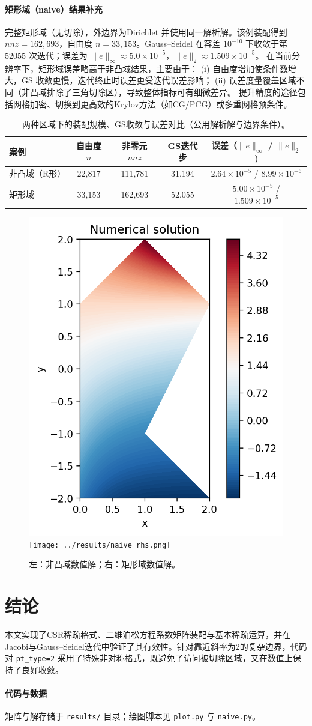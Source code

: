 \documentclass[11pt,a4paper]{article}
\begin{document}
\paragraph{矩形域（naive）结果补充}
完整矩形域（无切除），外边界为Dirichlet 并使用同一解析解。该例装配得到 $nnz=162{,}693$，自由度 $n=33{,}153$。Gauss--Seidel 在容差 $10^{-10}$ 下收敛于第 $52055$ 次迭代；误差为
$\|e\|_\infty \approx 5.0\times 10^{-5}$，$\|e\|_{2} \approx 1.509\times 10^{-5}$。
在当前分辨率下，矩形域误差略高于非凸域结果，主要由于：
(i) 自由度增加使条件数增大，GS 收敛更慢，迭代终止时误差更受迭代误差影响；
(ii) 误差度量覆盖区域不同（非凸域排除了三角切除区），导致整体指标可有细微差异。
提升精度的途径包括网格加密、切换到更高效的Krylov方法（如CG/PCG）或多重网格预条件。

\begin{table}[h]
\centering
\begin{tabular}{lcccc}
\hline
案例 & 自由度 $n$ & 非零元 $nnz$ & GS迭代步 & 误差（$\|e\|_\infty$ / $\|e\|_2$) \\
\hline
非凸域（R形） & 22{,}817 & 111{,}781 & 31{,}194 & $2.64\!\times\!10^{-5}$ / $8.99\!\times\!10^{-6}$ \\
矩形域 & 33{,}153 & 162{,}693 & 52{,}055 & $5.00\!\times\!10^{-5}$ / $1.509\!\times\!10^{-5}$ \\
\hline
\end{tabular}
\caption{两种区域下的装配规模、GS收敛与误差对比（公用解析解与边界条件）。}
\end{table}

\begin{figure}[h]
  \centering
  \includegraphics[width=0.46\linewidth]{../results/solution.png}\quad
  \texttt{[image: ../results/naive\_rhs.png]}
  \caption{左：非凸域数值解；右：矩形域数值解。}
\end{figure}

\section{结论}
本文实现了CSR稀疏格式、二维泊松方程系数矩阵装配与基本稀疏运算，并在Jacobi与Gauss--Seidel迭代中验证了其有效性。针对靠近斜率为2的复杂边界，代码对 \texttt{pt\_type=2} 采用了特殊非对称格式，既避免了访问被切除区域，又在数值上保持了良好收敛。

\paragraph{代码与数据}
矩阵与解存储于 \texttt{results/} 目录；绘图脚本见 \texttt{plot.py} 与 \texttt{naive.py}。
\end{document}
